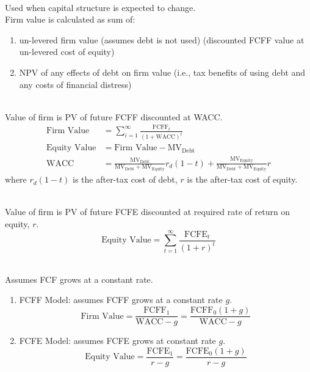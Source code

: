 \begin{method} \\
Used when capital structure is expected to change.\\
Firm value is calculated as sum of:
\begin{enumerate}[label=\roman*.]
\setlength{\itemsep}{0pt}
\item un-levered firm value (assumes debt is not used) (discounted FCFF value at un-levered cost of equity)
\item NPV of any effects of debt on firm value (i.e., tax benefits of using debt and any costs of financial distress)
\end{enumerate}
\end{method}

\begin{method} \\
Value of firm is PV of future FCFF discounted at WACC.
\begin{align}
\text{Firm Value} &= \sum\limits_{i=1}^{\infty} \frac{\text{FCFF}_t}{(1+\text{WACC})^t} \nonumber \\
\text{Equity Value} &= \text{Firm Value} - \text{MV}_{\text{Debt}} \nonumber \\
\text{WACC} &= \frac{\text{MV}_{\text{Debt}}}{\text{MV}_{\text{Debt}} + \text{MV}_{\text{Equity}}} r_d (1-t) + \frac{\text{MV}_{\text{Equity}}}{\text{MV}_{\text{Debt}} + \text{MV}_{\text{Equity}}}r \nonumber
\end{align}
where $r_d(1-t)$ is the after-tax cost of debt, $r$ is the after-tax cost of equity.
\end{method}

\begin{method} \\
Value of firm is PV of future FCFE discounted at required rate of return on equity, $r$.
\begin{equation}
\text{Equity Value} = \sum\limits_{t=1}^{\infty} \frac{\text{FCFE}_t}{(1+r)^t} \nonumber
\end{equation}
\end{method}

\begin{method} \\
Assumes FCF grows at a constant rate.
\begin{enumerate}[label=\roman*.]
\setlength{\itemsep}{0pt}
\item FCFF Model: assumes FCFF grows at a constant rate $g$.
\begin{equation}
\text{Firm Value} = \frac{\text{FCFF}_1}{\text{WACC}-g} = \frac{\text{FCFF}_0 (1+g)}{\text{WACC} - g} \nonumber
\end{equation}
\item FCFE Model: assumes FCFE grows at constant rate $g$.
\begin{equation}
\text{Equity Value} = \frac{\text{FCFE}_1}{r-g} = \frac{\text{FCFE}_0 (1+g)}{r - g} \nonumber \end{equation}
\end{enumerate}
\end{method}

